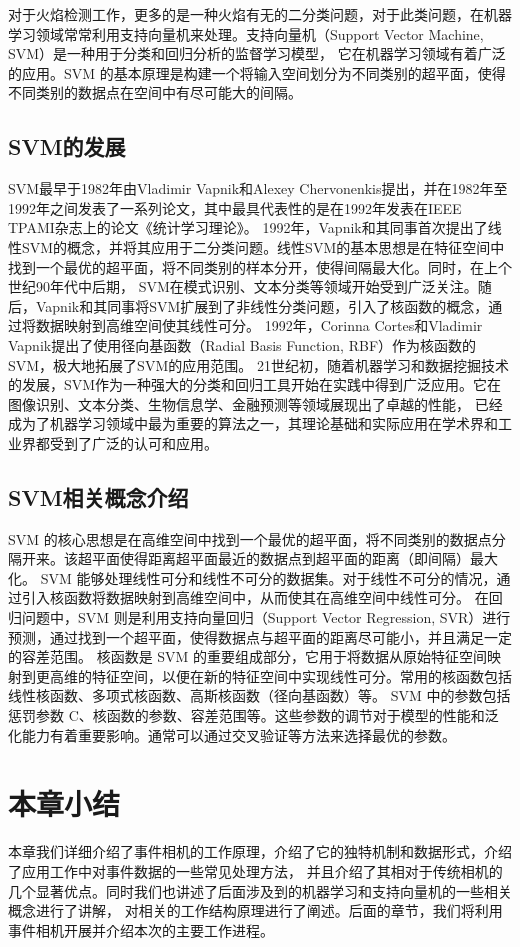 对于火焰检测工作，更多的是一种火焰有无的二分类问题，对于此类问题，在机器学习领域常常利用支持向量机来处理。支持向量机（Support Vector Machine, SVM）是一种用于分类和回归分析的监督学习模型，
它在机器学习领域有着广泛的应用。SVM 的基本原理是构建一个将输入空间划分为不同类别的超平面，使得不同类别的数据点在空间中有尽可能大的间隔。
\subsection{SVM的发展}
SVM最早于1982年由Vladimir Vapnik和Alexey Chervonenkis提出\cite{stitson1996theory}，并在1982年至1992年之间发表了一系列论文，其中最具代表性的是在1992年发表在IEEE TPAMI杂志上的论文《统计学习理论》。
1992年，Vapnik和其同事首次提出了线性SVM的概念，并将其应用于二分类问题\cite{chapelle1999support}。线性SVM的基本思想是在特征空间中找到一个最优的超平面，将不同类别的样本分开，使得间隔最大化。同时，在上个世纪90年代中后期，
SVM在模式识别、文本分类等领域开始受到广泛关注。随后，Vapnik和其同事将SVM扩展到了非线性分类问题，引入了核函数的概念，\cite{cortes1995support}通过将数据映射到高维空间使其线性可分。
1992年，Corinna Cortes和Vladimir Vapnik提出了使用径向基函数（Radial Basis Function, RBF）作为核函数的SVM，极大地拓展了SVM的应用范围。
21世纪初，随着机器学习和数据挖掘技术的发展，SVM作为一种强大的分类和回归工具开始在实践中得到广泛应用。它在图像识别、文本分类、生物信息学、金融预测等领域展现出了卓越的性能，
已经成为了机器学习领域中最为重要的算法之一，其理论基础和实际应用在学术界和工业界都受到了广泛的认可和应用。
\subsection{SVM相关概念介绍}
SVM 的核心思想是在高维空间中找到一个最优的超平面，将不同类别的数据点分隔开来。该超平面使得距离超平面最近的数据点到超平面的距离（即间隔）最大化。
SVM 能够处理线性可分和线性不可分的数据集。对于线性不可分的情况，通过引入核函数将数据映射到高维空间中，从而使其在高维空间中线性可分。
在回归问题中，SVM 则是利用支持向量回归（Support Vector Regression, SVR）进行预测，通过找到一个超平面，使得数据点与超平面的距离尽可能小，并且满足一定的容差范围。
核函数是 SVM 的重要组成部分，它用于将数据从原始特征空间映射到更高维的特征空间，以便在新的特征空间中实现线性可分。常用的核函数包括线性核函数、多项式核函数、高斯核函数（径向基函数）等。
SVM 中的参数包括惩罚参数 C、核函数的参数、容差范围等。这些参数的调节对于模型的性能和泛化能力有着重要影响。通常可以通过交叉验证等方法来选择最优的参数。






\section{本章小结}
本章我们详细介绍了事件相机的工作原理，介绍了它的独特机制和数据形式，介绍了应用工作中对事件数据的一些常见处理方法，
并且介绍了其相对于传统相机的几个显著优点。同时我们也讲述了后面涉及到的机器学习和支持向量机的一些相关概念进行了讲解，
对相关的工作结构原理进行了阐述。后面的章节，我们将利用事件相机开展并介绍本次的主要工作进程。